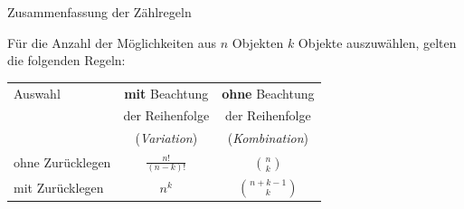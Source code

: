 \documentclass[12pt,ngerman,a4paper,ignorenonframetext,]{beamer}
\begin{document}
\begin{frame}{Zusammenfassung der Zählregeln}
\protect\hypertarget{zusammenfassung-der-zahlregeln}{}

Für die Anzahl der Möglichkeiten aus \(n\) Objekten \(k\) Objekte
auszuwählen, gelten die folgenden Regeln:

\begin{center}
    \begin{tabular}{lcc}
        \toprule
        Auswahl & \textbf{mit} Beachtung    & \textbf{ohne} Beachtung   \\
        ~       & der Reihenfolge           & der Reihenfolge           \\
        ~       & (\textit{Variation})      & (\textit{Kombination})    \\
        \midrule
        ohne Zurücklegen & $\displaystyle\frac{n!}{(n-k)!}$ & $\displaystyle\binom{n}{k}$ \\
        \midrule
        mit  Zurücklegen & $\displaystyle n^k$              & $\displaystyle\binom{n+k-1}{k}$ \\
        \bottomrule
    \end{tabular}
\end{center}

\end{frame}
\end{document}
